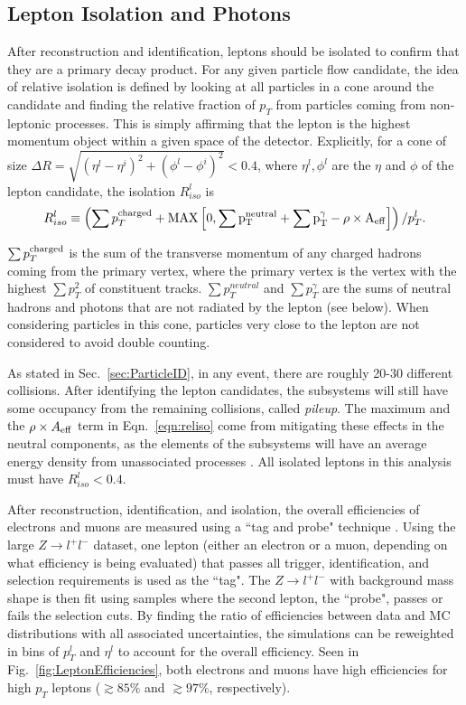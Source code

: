 \subsection{Lepton Isolation and Photons}
\label{sec:zz4lIsolation}

After reconstruction and identification, leptons should be isolated to confirm that they are a primary decay product. For any given particle flow candidate, the idea of relative isolation is defined by looking at all particles in a cone around the candidate and finding the relative fraction of $p_T$ from particles coming from non-leptonic processes. This is simply affirming that the lepton is the highest momentum object within a given space of the detector. Explicitly, for a cone of size $\Delta R = \sqrt{(\eta^l-\eta^i)^2 + (\phi^l-\phi^i)^2} < 0.4$, where $\eta^l,\phi^l$ are the $\eta$ and $\phi$ of the lepton candidate, the isolation $R_{iso}^l$ is
\begin{equation}
\label{eqn:reliso}
R_{iso}^l \equiv \left( \sum p_T^{\rm{charged}} + \rm{MAX}\left[0, \sum p_T^{neutral} + \sum p_T^{\gamma} - \rho\times A_{\rm{eff}}\right] \right) / p_T^{l}.
\end{equation}

$\sum p_T^{\rm{charged}}$ is the sum of the transverse momentum of any charged hadrons coming from the primary vertex, where the primary vertex is the vertex with the highest $\sum p_T^2$ of constituent tracks. $\sum p_T^{neutral}$ and $\sum p_T^{\gamma}$ are the sums of neutral hadrons and photons that are not radiated by the lepton (see below). When considering particles in this cone, particles very close to the lepton are not considered to avoid double counting.

As stated in Sec.~\ref{sec:ParticleID}, in any event, there are roughly 20-30 different collisions. After identifying the lepton candidates, the subsystems will still have some occupancy from the remaining collisions, called \textit{pileup}. The maximum and the $\rho\times A_{\rm{eff}}$ term in Eqn.~\ref{eqn:reliso} come from mitigating these effects in the neutral components, as the elements of the subsystems will have an average energy density from unassociated processes \cite{Cacciari:2007fd,Cacciari:2008gn}. All isolated leptons in this analysis must have $R_{iso}^l < 0.4$.

After reconstruction, identification, and isolation, the overall efficiencies of electrons and muons are measured using a ``tag and probe" technique \cite{MuonTR:2010,CMS_AN_2007-019}. Using the large $Z\rightarrow l^+l^-$ dataset, one lepton (either an electron or a muon, depending on what efficiency is being evaluated) that passes all trigger, identification, and selection requirements is used as the ``tag". The $Z\rightarrow l^+l^-$ with background mass shape is then fit using samples where the second lepton, the ``probe", passes or fails the selection cuts. By finding the ratio of efficiencies between data and MC distributions with all associated uncertainties, the simulations can be reweighted in bins of $p_T^{l}$ and $\eta^l$ to account for the overall efficiency. Seen in Fig.~\ref{fig:LeptonEfficiencies}, both electrons and muons have high efficiencies for high $p_T$ leptons ($\gtrsim85\%$ and $\gtrsim97\%$, respectively).

